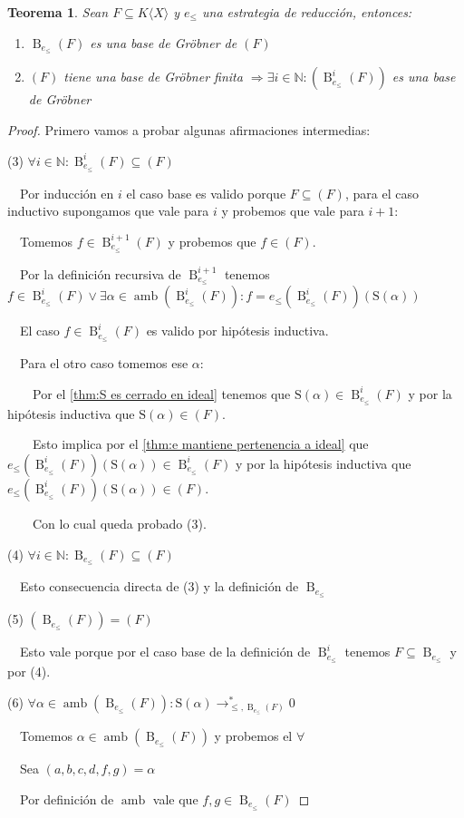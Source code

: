 \documentclass{amsbook} %
\theoremstyle{customstyle}
\newtheorem{theorem}{Teorema}[section]
\DeclareMathOperator{\amb}{amb}
\renewcommand{\S}{\text{S}}
\DeclareMathOperator{\B}{B}
\begin{document}
\begin{theorem}
Sean $F ⊆ K⟨X⟩$ y $e_≤$ una estrategia de reducción, entonces:
\begin{enumerate}
\item $\B_{e_≤}(F)$ es una base de Gröbner de $(F)$
\item $(F)$ tiene una base de Gröbner finita $⇒ ∃i ∈ ℕ : (\B_{e_≤}^i(F))$ es una base de Gröbner
\end{enumerate}
\end{theorem}
\begin{proof}
Primero vamos a probar algunas afirmaciones intermedias:

(3) $∀i ∈ ℕ : \B_{e_≤}^{i}(F) ⊆ (F)$

  Por inducción en $i$ el caso base es valido porque $F ⊆ (F)$, para el caso inductivo supongamos que vale para $i$ y probemos que vale para $i + 1$:

  Tomemos $f ∈ \B_{e_≤}^{i + 1}(F)$ y probemos que $f ∈ (F)$.

  Por la definición recursiva de $\B_{e_≤}^{i + 1}$ tenemos $f ∈ \B_{e_≤}^i(F) ∨ ∃α ∈ \amb(\B_{e_≤}^i(F)) : f = e_≤(\B_{e_≤}^i(F))(\S(α))$

  El caso $f ∈ \B_{e_≤}^i(F)$ es valido por hipótesis inductiva.

  Para el otro caso tomemos ese $α$:

    Por el \cref{thm:S es cerrado en ideal} tenemos que $\S(α) ∈ \B_{e_≤}^i(F)$ y por la hipótesis inductiva que $\S(α) ∈ (F)$.

    Esto implica por el \cref{thm:e mantiene pertenencia a ideal} que $e_≤(\B_{e_≤}^i(F))(\S(α)) ∈ \B_{e_≤}^i(F)$ y por la hipótesis inductiva que $e_≤(\B_{e_≤}^i(F))(\S(α)) ∈ (F)$.

    Con lo cual queda probado (3).

(4) $∀i ∈ ℕ : \B_{e_≤}(F) ⊆ (F)$

  Esto consecuencia directa de (3) y la definición de $\B_{e_≤}$

(5) $(\B_{e_≤}(F)) = (F)$

  Esto vale porque por el caso base de la definición de $\B_{e_≤}^i$ tenemos $F ⊆ \B_{e_≤}$ y por (4).

(6) $∀α ∈ \amb(\B_{e_≤}(F)) : \S(α) →^*_{≤, \B_{e_≤}(F)} 0$

  Tomemos $α ∈ \amb(\B_{e_≤}(F))$ y probemos el $∀$

  Sea $(a, b, c, d, f, g) = α$

  Por definición de $\amb$ vale que $f, g ∈ \B_{e_≤}(F)$


\end{proof}
\end{document}

